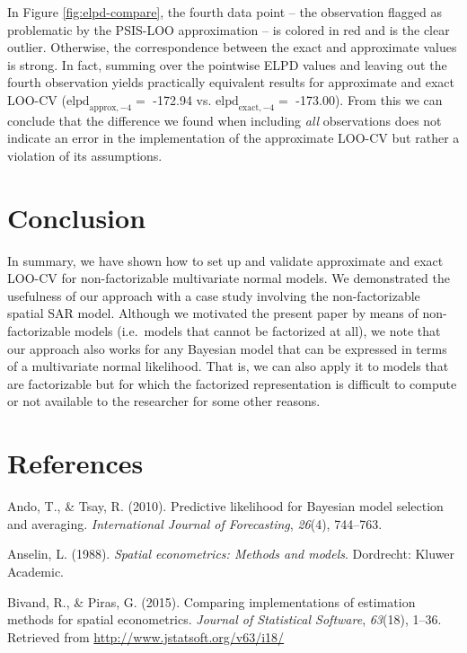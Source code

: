 \documentclass[english,,doc,floatsintext]{apa6}
\theoremstyle{definition}
\theoremstyle{definition}
\theoremstyle{definition}
\theoremstyle{remark}
\begin{document}
In Figure \ref{fig:elpd-compare}, the fourth data point -- the
observation flagged as problematic by the PSIS-LOO approximation -- is
colored in red and is the clear outlier. Otherwise, the correspondence
between the exact and approximate values is strong. In fact, summing
over the pointwise ELPD values and leaving out the fourth observation
yields practically equivalent results for approximate and exact LOO-CV
(\(\text{elpd}_{\text{approx},-4} =\) -172.94 vs.
\(\text{elpd}_{\text{exact},-4} =\) -173.00). From this we can conclude
that the difference we found when including \emph{all} observations does
not indicate an error in the implementation of the approximate LOO-CV
but rather a violation of its assumptions.

\hypertarget{conclusion}{%
\section{Conclusion}\label{conclusion}}

In summary, we have shown how to set up and validate approximate and
exact LOO-CV for non-factorizable multivariate normal models. We
demonstrated the usefulness of our approach with a case study involving
the non-factorizable spatial SAR model. Although we motivated the
present paper by means of non-factorizable models (i.e.~models that
cannot be factorized at all), we note that our approach also works for
any Bayesian model that can be expressed in terms of a multivariate
normal likelihood. That is, we can also apply it to models that are
factorizable but for which the factorized representation is difficult to
compute or not available to the researcher for some other reasons.

\hypertarget{references}{%
\section*{References}\label{references}}

\hypertarget{refs}{}
\leavevmode\hypertarget{ref-ando2010}{}%
Ando, T., \& Tsay, R. (2010). Predictive likelihood for Bayesian model
selection and averaging. \emph{International Journal of Forecasting},
\emph{26}(4), 744--763.

\leavevmode\hypertarget{ref-anselin1988}{}%
Anselin, L. (1988). \emph{Spatial econometrics: Methods and models}.
Dordrecht: Kluwer Academic.

\leavevmode\hypertarget{ref-bivand2015}{}%
Bivand, R., \& Piras, G. (2015). Comparing implementations of estimation
methods for spatial econometrics. \emph{Journal of Statistical
Software}, \emph{63}(18), 1--36. Retrieved from
\url{http://www.jstatsoft.org/v63/i18/}
\end{document}
